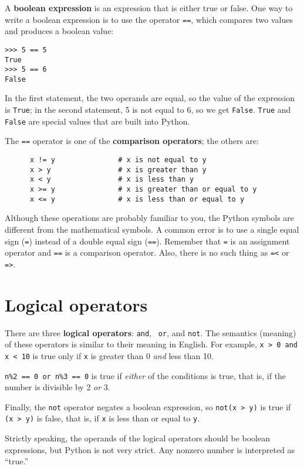 A {\bf boolean expression} is an expression that is either true
or false.  One way to write a boolean expression is to use the
operator {\tt ==}, which compares two values and produces a boolean
value:

\beforeverb
\begin{verbatim}
>>> 5 == 5
True
>>> 5 == 6
False
\end{verbatim}
\afterverb
%
In the first statement, the two operands are equal, so the value of
the expression is {\tt True}; in the second statement, 5 is not equal
to 6, so we get {\tt False}.  {\tt True} and {\tt False} are special
values that are built into Python.

The {\tt ==} operator is one of the {\bf comparison operators}; the
others are:

\beforeverb
\begin{verbatim}
      x != y               # x is not equal to y
      x > y                # x is greater than y
      x < y                # x is less than y
      x >= y               # x is greater than or equal to y
      x <= y               # x is less than or equal to y
\end{verbatim}
\afterverb
%
Although these operations are probably familiar to you, the Python
symbols are different from the mathematical symbols.  A common error
is to use a single equal sign ({\tt =}) instead of a double equal sign
({\tt ==}).  Remember that {\tt =} is an assignment operator and
{\tt ==} is a comparison operator.   Also, there is no such thing as
{\tt =<} or {\tt =>}.


\section {Logical operators}

There are three {\bf logical operators}: {\tt and}, {\tt
or}, and {\tt not}.  The semantics (meaning) of these operators is
similar to their meaning in English.  For example,
{\tt x > 0 and x < 10} is true only if {\tt x} is greater than 0
{\em and} less than 10.

{\tt n\%2 == 0 or n\%3 == 0} is true if {\em either} of the conditions
is true, that is, if the number is divisible by 2 {\em or} 3.

Finally, the {\tt not} operator negates a boolean
expression, so {\tt not(x > y)} is true if {\tt (x > y)} is false,
that is, if {\tt x} is less than or equal to {\tt y}.

Strictly speaking, the operands of the logical operators should be
boolean expressions, but Python is not very strict.
Any nonzero number is interpreted as ``true.''

